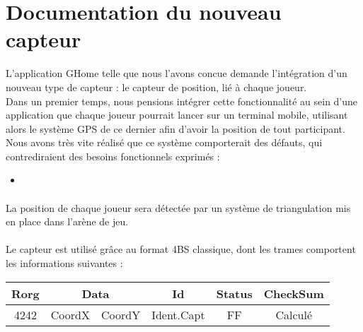 \section{Documentation du nouveau capteur}

L'application GHome telle que nous l'avons concue demande l'intégration d'un nouveau type de capteur : le capteur de position, lié à chaque joueur.\\

Dans un premier temps, nous pensions intégrer cette fonctionnalité au sein d'une application que chaque joueur pourrait lancer sur un terminal mobile, utilisant alors le système GPS de ce dernier afin d'avoir la position de tout participant.\\
Nous avons très vite réalisé que ce système comporterait des défauts, qui contrediraient des besoins fonctionnels exprimés : 
\begin{itemize}
 \item 
\end{itemize}

\paragraph{}
La position de chaque joueur sera détectée par un système de triangulation mis en place dans l'arène de jeu.\\


\paragraph{}
Le capteur est utilisé grâce au format 4BS classique, dont les trames comportent les informations suivantes : 

\begin{center}
\begin{tabular}{|c|c|c|c|c|c|}
\hline
Rorg&\multicolumn{2}{|c|}{Data}&Id&Status&CheckSum\\
\hline
4242&CoordX&CoordY&Ident.Capt&FF&Calculé\\
\hline
\end{tabular}
\end{center}